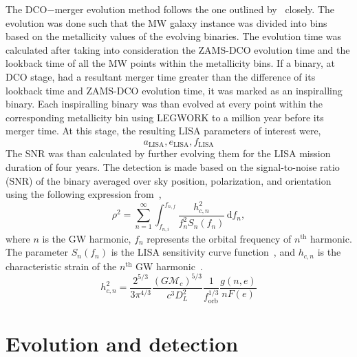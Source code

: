 \documentclass[journal, twocolumns]{IEEEtran}
\newcommand{\semaxis}[1]{a_{\text{#1}}}
\newcommand{\ecc}[1]{e_\text{#1}}
\begin{document}
    The DCO$-$merger evolution method follows the one outlined by~\cite{wagg2021gravitational} closely.
    The evolution was done such that the MW galaxy instance was divided into bins based on the metallicity values of the evolving binaries.
    The evolution time was calculated after taking into consideration the ZAMS-DCO evolution time and the lookback time of all the MW points within the metallicity bins.
    If a binary, at DCO stage, had a resultant merger time greater than the difference of its lookback time and ZAMS-DCO evolution time, it was marked as an inspiralling binary.
    Each inspiralling binary was than evolved at every point within the corresponding metallicity bin using LEGWORK to a million year before its merger time.
    At this stage, the resulting LISA parameters of interest were,
    \begin{equation}%
        \semaxis{LISA}, \ecc{LISA}, f_{\text{LISA}}
        \label{eq:lisa_parameter_names}
    \end{equation}%
    The SNR was than calculated by further evolving them for the LISA mission duration of four years.
    The detection is made based on the signal-to-noise ratio (SNR) of the binary averaged over sky position, polarization, and orientation using the following expression from~\cite{Finn2000},
    \begin{equation}
        \rho^2 = \sum_{n=1}^{\infty}\int_{f_{n, i}}^{f_{n, f}}\frac{h_{c, n}^2}{f_n^2 S_n(f_n)}\,\text{d}f_n,
        \label{eq:snr_equation}
    \end{equation}
    where $n$ is the GW harmonic, $f_n$ represents the orbital frequency of $n^\text{th}$ harmonic.
    The parameter $S_n(f_n)$ is the LISA sensitivity curve function~\cite{Robson2019}, and $h_{c, n}$ is the characteristic strain of the $n^\text{th}$ GW harmonic~\cite{Barack2004}.
    \begin{equation}
        h_{c,n}^2 = \frac{2^{5/3}}{3\pi^{4/3}}\frac{(G\mathcal{M}_c)^{5/3}}{c^3 D_L^2}\frac{1}{f_\text{orb}^{1/3}}\frac{g(n, e)}{nF(e)}
        \label{eq:characteristic_strain}
    \end{equation}

    \section{Evolution and detection}
    \label{sec:evolution-and-detection}
\end{document}

